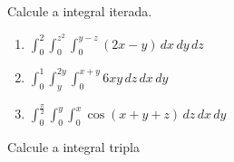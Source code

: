 \documentclass[a4paper, 12pt]{article}
\begin{document}
	
	\vspace{5mm}
	
	Calcule a integral iterada.
	
	\begin{enumerate}
		
		\item $\displaystyle \int_{0}^{2} \int_{0}^{z^2} \int_{0}^{y-z} (2x - y) \, dx \, dy \, dz$
		
		\item $\displaystyle \int_{0}^{1} \int_{y}^{2y} \int_{0}^{x+y} 6xy \, dz \, dx \, dy$
		
		\item $\displaystyle \int_{0}^{\frac{\pi}{2}} \int_{0}^{y} \int_{0}^{x} \cos(x+y+z) \, dz \, dx \, dy$
	
	\end{enumerate}
	
	\vspace{5mm}
	
	Calcule a integral tripla
	
\end{document}
